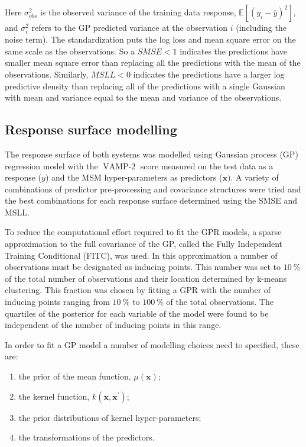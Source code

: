 Here $\sigma_{obs}^{2}$ is the observed variance of the training data response, $\mathbb{E}\left[(y_{i}-\bar{y})^{2}\right]$, and $\sigma_{i}^{2}$ refers to the GP predicted variance at the observation $i$ (including the noise term). The standardization puts the log loss and mean square error on the same scale as the observations. So a $SMSE < 1$ indicates the predictions have smaller mean square error than replacing all the predictions with the mean of the observations. Similarly, $MSLL<0$ indicates the predictions have a larger log predictive density than replacing all of the predictions with a single Gaussian with mean and variance equal to the mean and variance of the observations.   

\subsection{Response surface modelling}\label{subsec:rsm}
The response surface of both systems was modelled using Gaussian process (GP) regression model with the $\operatorname{VAMP-2}$ score measured on the test data as a response ($y$) and the MSM hyper-parameters as predictors ($\mathbf{x})$. A variety of combinations of predictor pre-processing and covariance structures were tried and the best combinations for each response surface determined using the SMSE and MSLL. 

To reduce the computational effort required to fit the GPR models, a sparse approximation to the full covariance of the GP, called the Fully Independent Training Conditional (FITC)\cite{quinonero-candelaUnifyingViewSparse2005}, was used. In this approximation a number of observations must be designated as inducing points. This number was set to $\SI{10}{\percent}$ of the total number of observations and their location determined by k-means clustering. This fraction was chosen by fitting a GPR with the number of inducing points ranging from $\SI{10}{\percent}$ to $\SI{100}{\percent}$ of the total observations. The quartiles of the posterior for each variable of the model were found to be independent of the number of inducing points in this range.  

In order to fit a GP model a number of modelling choices need to specified, these are: 
\begin{enumerate}
    \item the prior of the mean function, $\mu(\mathbf{x})$;
    \item the kernel function, $k(\mathbf{x}, \mathbf{x}^{\prime})$;
    \item the prior distributions of kernel hyper-parameters;
    \item the transformations of the predictors.
\end{enumerate}

